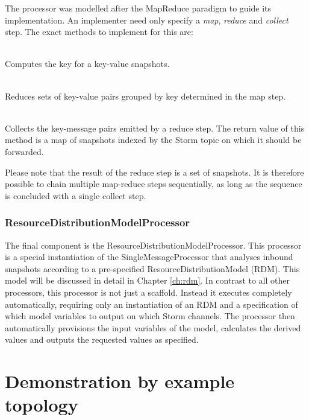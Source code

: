 The processor was modelled after the MapReduce paradigm \cite{mapreduce} to guide its implementation. An implementer need only specify a \emph{map}, \emph{reduce} and \emph{collect} step.  The exact methods to implement for this are: 
\begin{description}[font=\normalfont]
\item[\emph{map(Message m) : String}] \hfill \\ Computes the key for a key-value snapshots.
\item[\emph{reduce(String key, List\textless Message\textgreater\ l) : Message}] \hfill \\ Reduces sets of key-value pairs grouped by key determined in the map step.
\item[\emph{collect(Map\textless String,Message\textgreater\ m) : Map\textless String,Message\textgreater}] \hfill \\ Collects the key-message pairs emitted by a reduce step. The return value of this method is a map of snapshots indexed by the Storm topic on which it should be forwarded.
\end{description}
Please note that the result of the reduce step is a set of snapshots. It is therefore possible to chain multiple map-reduce steps sequentially, as long as the sequence is concluded with a single collect step.

\subsubsection*{ResourceDistributionModelProcessor}
The final component is the ResourceDistributionModelProcessor. This processor is a special instantiation of the SingleMessageProcessor that analyses inbound snapshots according to a pre-specified ResourceDistributionModel (RDM). This model will be discussed in detail in Chapter \ref{ch:rdm}. In contrast to all other processors, this processor is not just a scaffold. Instead it executes completely automatically, requiring only an instantiation of an RDM and a specification of which model variables to output on which Storm channels. The processor then automatically provisions the input variables of the model, calculates the derived values and outputs the requested values as specified.

\section{Demonstration by example topology}
\label{sec:example_application_topology}

